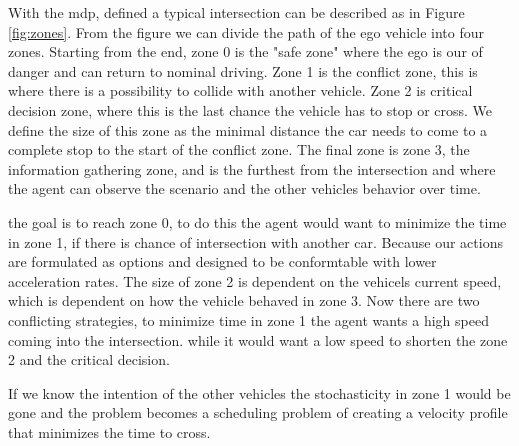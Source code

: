 With the \gls{mdp}, defined a typical intersection can be described as in Figure \ref{fig:zones}. From the figure we can divide the path of the ego vehicle into four zones. Starting from the end, zone 0 is the "safe zone" where the ego is our of danger and can return to nominal driving. Zone 1 is the conflict zone, this is where there is a possibility to collide with another vehicle. Zone 2 is critical decision zone, where this is the last chance the vehicle has to stop or cross. We define the size of this zone as the minimal distance the car needs to come to a complete stop to the start of the conflict zone. The final zone is zone 3, the information gathering zone, and is the furthest from the intersection and where the agent can observe the scenario and the other vehicles behavior over time. 

the goal is to reach zone 0, 
to do this the agent would want to minimize the time in zone 1, if there is chance of intersection with another car.
Because our actions are formulated as options and designed to be conformtable with lower acceleration rates. The size of zone 2 is dependent on the vehicels current speed, which is dependent on how the vehicle behaved in zone 3. 
Now there are two conflicting strategies, to minimize time in zone 1 the agent wants a high speed coming into the intersection. while it would want a low speed to shorten the zone 2 and the critical decision. 

If we know the intention of the other vehicles the stochasticity in zone 1 would be gone and the problem becomes a scheduling problem of creating a velocity profile that minimizes the time to cross.  

